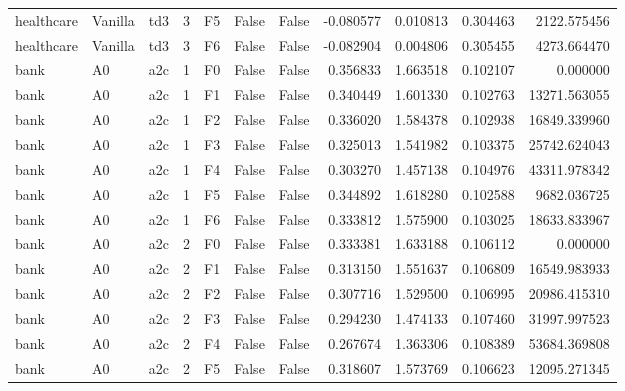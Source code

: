 \begin{tabular}{lllrlllrrrr}
healthcare & Vanilla &       td3 &     3 &  F5 &           False &            False & -0.080577 &  0.010813 & 0.304463 &      2122.575456 \\
healthcare & Vanilla &       td3 &     3 &  F6 &           False &            False & -0.082904 &  0.004806 & 0.305455 &      4273.664470 \\
      bank &      A0 &       a2c &     1 &  F0 &           False &            False &  0.356833 &  1.663518 & 0.102107 &         0.000000 \\
      bank &      A0 &       a2c &     1 &  F1 &           False &            False &  0.340449 &  1.601330 & 0.102763 &     13271.563055 \\
      bank &      A0 &       a2c &     1 &  F2 &           False &            False &  0.336020 &  1.584378 & 0.102938 &     16849.339960 \\
      bank &      A0 &       a2c &     1 &  F3 &           False &            False &  0.325013 &  1.541982 & 0.103375 &     25742.624043 \\
      bank &      A0 &       a2c &     1 &  F4 &           False &            False &  0.303270 &  1.457138 & 0.104976 &     43311.978342 \\
      bank &      A0 &       a2c &     1 &  F5 &           False &            False &  0.344892 &  1.618280 & 0.102588 &      9682.036725 \\
      bank &      A0 &       a2c &     1 &  F6 &           False &            False &  0.333812 &  1.575900 & 0.103025 &     18633.833967 \\
      bank &      A0 &       a2c &     2 &  F0 &           False &            False &  0.333381 &  1.633188 & 0.106112 &         0.000000 \\
      bank &      A0 &       a2c &     2 &  F1 &           False &            False &  0.313150 &  1.551637 & 0.106809 &     16549.983933 \\
      bank &      A0 &       a2c &     2 &  F2 &           False &            False &  0.307716 &  1.529500 & 0.106995 &     20986.415310 \\
      bank &      A0 &       a2c &     2 &  F3 &           False &            False &  0.294230 &  1.474133 & 0.107460 &     31997.997523 \\
      bank &      A0 &       a2c &     2 &  F4 &           False &            False &  0.267674 &  1.363306 & 0.108389 &     53684.369808 \\
      bank &      A0 &       a2c &     2 &  F5 &           False &            False &  0.318607 &  1.573769 & 0.106623 &     12095.271345 \\

\end{tabular}

